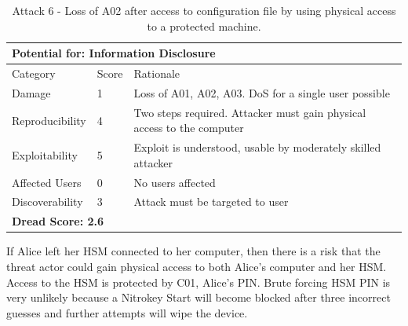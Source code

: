 \documentclass [11pt, proquest] {uwthesis}[2020/02/24]
\begin{document}
\begin{table}[H]
\begin{tabular}{|m{3cm}|m{.9cm}|p{27em} |}
\multicolumn{3}{l}{Potential for: Information Disclosure}                   \\
\hline
Category & Score & Rationale \\
\hline
Damage          & 1     & Loss of A01, A02, A03. DoS for a single user possible            \\
\hline
Reproducibility & 4     & Two steps required. Attacker must gain physical access to the computer     \\
\hline
Exploitability & 5      & Exploit is understood, usable by moderately skilled attacker  \\
\hline
Affected Users  & 0     &  No users affected                          \\
\hline
Discoverability & 3     & Attack must be targeted to user \\
\hline
\multicolumn{3}{l}{\textbf{Dread Score: 2.6}} 
\end{tabular}
\caption{Attack 6 - Loss of A02 after access to configuration file by using physical access to a protected machine.}
\label{hsm:attack6}
\end{table}

If Alice left her HSM connected to her computer, then there is a risk that the threat actor could gain physical access to both Alice's computer and her HSM. Access to the HSM is protected by C01, Alice's PIN. Brute forcing HSM PIN is very unlikely because a Nitrokey Start will become blocked after three incorrect guesses and further attempts will wipe the device.
\end{document}

